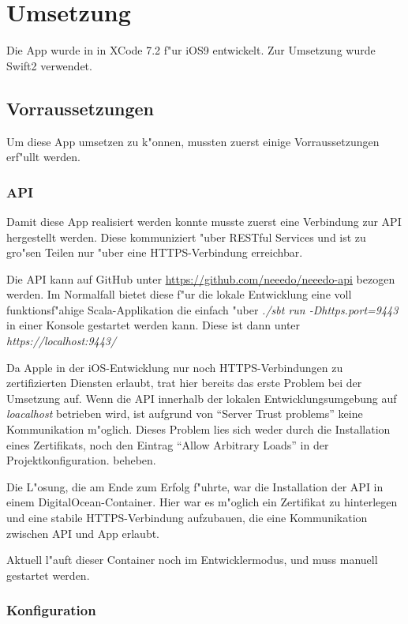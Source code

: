 \section{Umsetzung}

Die App wurde in in XCode 7.2 f"ur iOS9 entwickelt. Zur Umsetzung wurde Swift2 verwendet.  

\subsection{Vorraussetzungen}

Um diese App umsetzen zu k"onnen, mussten zuerst einige Vorraussetzungen erf"ullt werden.

\subsubsection*{API}

Damit diese App realisiert werden konnte musste zuerst eine Verbindung zur API hergestellt werden. 
Diese kommuniziert "uber RESTful Services und ist zu gro"sen Teilen nur "uber eine HTTPS-Verbindung erreichbar. 

Die API kann auf GitHub unter \url{https://github.com/neeedo/neeedo-api} bezogen werden. 
Im Normalfall bietet diese f"ur die lokale Entwicklung eine voll funktionsf"ahige Scala-Applikation die einfach "uber \textit{./sbt
run -Dhttps.port=9443} in einer Konsole gestartet werden kann. Diese ist dann unter \textit{https://localhost:9443/} 

Da Apple in der iOS-Entwicklung nur noch HTTPS-Verbindungen zu zertifizierten Diensten erlaubt, trat hier bereits das erste Problem bei der Umsetzung auf. 
Wenn die API innerhalb der lokalen Entwicklungsumgebung auf \textit{loacalhost} betrieben wird, ist aufgrund von \enquote{Server Trust problems} keine Kommunikation m"oglich.
Dieses Problem lies sich weder durch die Installation eines Zertifikats, noch den Eintrag \enquote{Allow Arbitrary Loads} in der Projektkonfiguration. beheben.

Die L"osung, die am Ende zum Erfolg f"uhrte, war die Installation der API in einem DigitalOcean-Container. Hier war es m"oglich ein Zertifikat zu hinterlegen und eine stabile HTTPS-Verbindung aufzubauen, die eine Kommunikation zwischen API und App erlaubt.

Aktuell l"auft dieser Container noch im Entwicklermodus, und muss manuell gestartet werden. 

\subsubsection*{Konfiguration}

